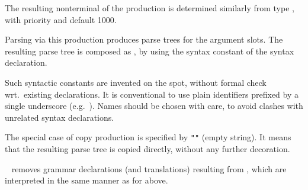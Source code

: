 \begin{isabellebody}
\begin{isamarkuptext}
\begin{description}
  The resulting nonterminal of the production is determined similarly
  from type , with priority  and default 1000.

  \medskip Parsing via this production produces parse trees  for the argument slots.  The resulting parse tree is
  composed as , by using the syntax constant  of the syntax declaration.

  Such syntactic constants are invented on the spot, without formal
  check wrt.\ existing declarations.  It is conventional to use plain
  identifiers prefixed by a single underscore (e.g.\ ).  Names should be chosen with care, to avoid clashes
  with unrelated syntax declarations.

  \medskip The special case of copy production is specified by \verb|""| (empty string).  It means that the
  resulting parse tree  is copied directly, without any
  further decoration.

  \item \hyperlink{command.no-syntax}{\mbox{}}~ removes grammar
  declarations (and translations) resulting from , which
  are interpreted in the same manner as for \hyperlink{command.syntax}{\mbox{}} above.


\end{description}
\end{isamarkuptext}
\end{isabellebody}

